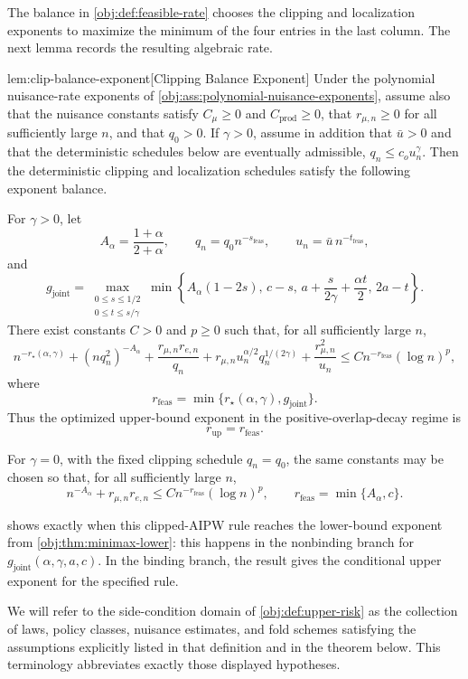 The balance in \cref{obj:def:feasible-rate} chooses the clipping and localization exponents to maximize the minimum of the four entries in the last column.  The next lemma records the resulting algebraic rate.

\begin{lemmav}{lem:clip-balance-exponent}[Clipping Balance Exponent]
Under the polynomial nuisance-rate exponents of \cref{obj:ass:polynomial-nuisance-exponents}, assume also that the nuisance constants satisfy \(C_\mu\ge0\) and \(C_{\mathrm{prod}}\ge0\), that \(r_{\mu,n}\ge0\) for all sufficiently large \(n\), and that \(q_0>0\).  If \(\gamma>0\), assume in addition that \(\bar u>0\) and that the deterministic schedules below are eventually admissible, \(q_n\le c_o u_n^\gamma\).  Then the deterministic clipping and localization schedules satisfy the following exponent balance.

For \(\gamma>0\), let
\[
A_\alpha=\frac{1+\alpha}{2+\alpha},
\qquad
q_n=q_0 n^{-s_{\mathrm{feas}}},
\qquad
u_n=\bar u\, n^{-t_{\mathrm{feas}}},
\]
and
\[
g_{\mathrm{joint}}
=
\max_{\substack{0\le s\le 1/2\\ 0\le t\le s/\gamma}}
\min\left\{
A_\alpha(1-2s),\,
c-s,\,
a+\frac{s}{2\gamma}+\frac{\alpha t}{2},\,
2a-t
\right\}.
\]
There exist constants \(C>0\) and \(p\ge0\) such that, for all sufficiently large \(n\),
\[
 n^{-r_\star(\alpha,\gamma)}
 + (nq_n^2)^{-A_\alpha}
 + \frac{r_{\mu,n}r_{e,n}}{q_n}
 + r_{\mu,n}u_n^{\alpha/2}q_n^{1/(2\gamma)}
 + \frac{r_{\mu,n}^2}{u_n}
\le
C n^{-r_{\mathrm{feas}}}(\log n)^p,
\]
where
\[
r_{\mathrm{feas}}
=
\min\{r_\star(\alpha,\gamma),g_{\mathrm{joint}}\}.
\]
Thus the optimized upper-bound exponent in the positive-overlap-decay regime is
\[
r_{\mathrm{up}}=r_{\mathrm{feas}}.
\]

For \(\gamma=0\), with the fixed clipping schedule \(q_n=q_0\), the same constants may be chosen so that, for all sufficiently large \(n\),
\[
n^{-A_\alpha}+r_{\mu,n}r_{e,n}
\le
C n^{-r_{\mathrm{feas}}}(\log n)^p,
\qquad
r_{\mathrm{feas}}=\min\{A_\alpha,c\}.
\]
\end{lemmav}

 shows exactly when this clipped-AIPW rule reaches the lower-bound exponent from \cref{obj:thm:minimax-lower}: this happens in the nonbinding branch for \(g_{\mathrm{joint}}(\alpha,\gamma,a,c)\).  In the binding branch, the result gives the conditional upper exponent for the specified rule.

We will refer to the side-condition domain of \cref{obj:def:upper-risk} as the collection of laws, policy classes, nuisance estimates, and fold schemes satisfying the assumptions explicitly listed in that definition and in the theorem below.  This terminology abbreviates exactly those displayed hypotheses.


